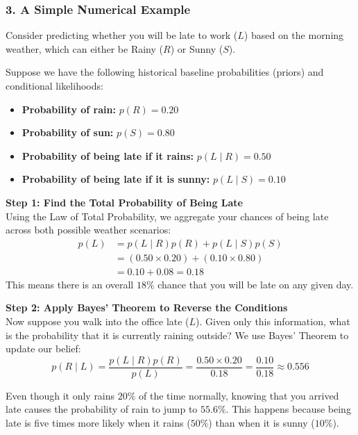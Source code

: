 \documentclass{article}
\begin{document}
\subsubsection*{3. A Simple Numerical Example}
Consider predicting whether you will be late to work ($L$) based on the morning weather, which can either be Rainy ($R$) or Sunny ($S$). 

\noindent Suppose we have the following historical baseline probabilities (priors) and conditional likelihoods:
\begin{itemize}
    \item \textbf{Probability of rain:} $p(R) = 0.20$
    \item \textbf{Probability of sun:} $p(S) = 0.80$
    \item \textbf{Probability of being late if it rains:} $p(L \mid R) = 0.50$
    \item \textbf{Probability of being late if it is sunny:} $p(L \mid S) = 0.10$
\end{itemize}

\vspace{0.2cm}
\noindent \textbf{Step 1: Find the Total Probability of Being Late} \\
Using the Law of Total Probability, we aggregate your chances of being late across both possible weather scenarios:
\begin{align}
    p(L) &= p(L \mid R)p(R) + p(L \mid S)p(S) \\
    &= (0.50 \times 0.20) + (0.10 \times 0.80) \\
    &= 0.10 + 0.08 = \mathbf{0.18}
\end{align}
This means there is an overall $18\%$ chance that you will be late on any given day.

\vspace{0.2cm}
\noindent \textbf{Step 2: Apply Bayes' Theorem to Reverse the Conditions} \\
Now suppose you walk into the office late ($L$). Given only this information, what is the probability that it is currently raining outside? We use Bayes' Theorem to update our belief:
\begin{equation}
    p(R \mid L) = \frac{p(L \mid R)p(R)}{p(L)} = \frac{0.50 \times 0.20}{0.18} = \frac{0.10}{0.18} \approx \mathbf{0.556}
\end{equation}

\begin{tcolorbox}[colback=green!5!white, colframe=green!60!black, title=Intuitive Takeaway]
Even though it only rains $20\%$ of the time normally, knowing that you arrived late causes the probability of rain to jump to $55.6\%$. This happens because being late is five times more likely when it rains ($50\%$) than when it is sunny ($10\%$).
\end{tcolorbox}
\end{document}
